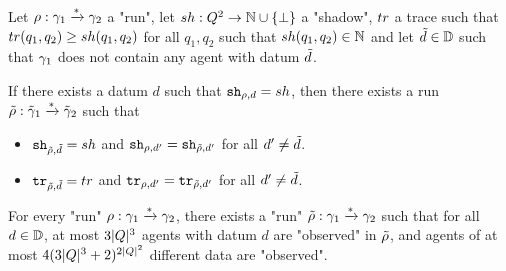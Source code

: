 \begin{lemma}
	\label{lem:data-copycat}
	Let  $\rho : \gamma_1 \xrightarrow{*} \gamma_2$ a "run", let $sh : Q^2 \to \mathbb{N} \cup \{\bot\}$ a "shadow", $tr$ a trace such that $tr(q_1, q_2) \geq sh(q_1, q_2)$ for all $q_1, q_2$ such that $sh(q_1, q_2) \in \mathbb{N}$ and let $\Tilde{d} \in \mathbb{D}$ such that $\gamma_1$ does not contain any agent with datum $\Tilde{d}$. 
	
	If there exists a datum $d$ such that $\mathtt{sh}_{\rho,d}=sh$, then there exists a run $\Tilde{\rho} : \Tilde{\gamma}_1 \xrightarrow{*} \Tilde{\gamma}_2$ such that
	\begin{itemize}
		\item $\mathtt{sh}_{\Tilde{\rho},\Tilde{d}} = sh$ and $\mathtt{sh}_{\rho,d'} = \mathtt{sh}_{\Tilde{\rho},d'}$ for all $d' \neq \Tilde{d}$.
		
		\item $\mathtt{tr}_{\Tilde{\rho},\Tilde{d}} = tr$ and $\mathtt{tr}_{\rho,d'} = \mathtt{tr}_{\Tilde{\rho},d'}$ for all $d' \neq \Tilde{d}$.
	\end{itemize}
\end{lemma}

\begin{corollary}
	\label{cor:run-few-observed-data-and-agents}
	For every "run" $\rho : \gamma_1 \xrightarrow{*} \gamma_2$, there exists a "run" $\Tilde{\rho} : \gamma_1 \xrightarrow{*} \gamma_2$ such that for all $d \in \mathbb{D}$, at most $3|Q|^3$ agents with datum $d$ are "observed" in $\Tilde{\rho}$, and agents of at most $4(3|Q|^3+2)^{2|Q|^2}$ different data are "observed".
\end{corollary}


